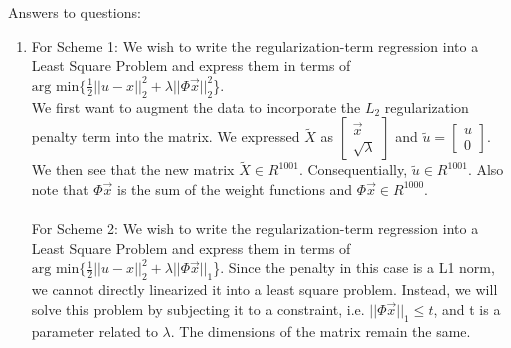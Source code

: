 \documentclass[a4paper]{article}
\begin{document}
Answers to questions:
\begin{enumerate}
\item  
\subitem For Scheme 1:
We wish to write the regularization-term regression into a Least Square Problem and express them in terms of \\ $\text{arg min} \{ \frac{1}{2} || u - x||^2_2 + \lambda || \Phi \vec{x}||^2_2$\}. \\ We first want to augment the data to incorporate the $L_2$ regularization penalty term into the matrix.  We  expressed $\tilde{X}$ as $\begin{bmatrix}
\vec{x} \\ \sqrt{\lambda} \end{bmatrix}$ and $\tilde{u} = \begin{bmatrix}
u \\ 0 \end{bmatrix}$. We then see that the new matrix  $\tilde{X} \in R^{1001}$. Consequentially, $\tilde{u} \in R^{1001}$. Also note that $\Phi\vec{x}$ is the sum of the weight functions and $\Phi \vec{x} \in R^{1000}$. \\

\noindent{} \\ 

\subitem For Scheme 2: We wish to write the regularization-term regression into a Least Square Problem and express them in terms of \\ $\text{arg min} \{ \frac{1}{2} || u - x||^2_2 + \lambda || \Phi \vec{x}||_1 $\}. Since the penalty in this case is a L1 norm, we cannot directly linearized it into a least square problem. Instead, we will solve this problem by subjecting it to a constraint, i.e. $||\Phi\vec{x}||_1 \leq t $, and t is a parameter related to $\lambda $. The dimensions of the matrix remain the same. \\




\end{enumerate}
\end{document}
